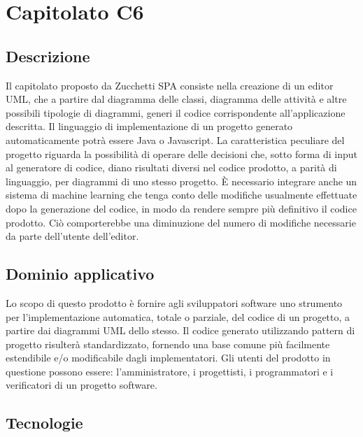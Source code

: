 \newpage
\section{Capitolato C6}

\subsection{Descrizione}

Il capitolato proposto da Zucchetti SPA consiste nella creazione di un editor UML, che a partire dal diagramma delle classi, diagramma delle attività e altre possibili tipologie di diagrammi, generi il codice corrispondente all'applicazione descritta. Il linguaggio di implementazione di un progetto generato automaticamente potrà essere Java o Javascript. La caratteristica peculiare del progetto riguarda la possibilità di operare delle decisioni che, sotto forma di input al generatore di codice, diano risultati diversi nel codice prodotto, a parità di linguaggio, per diagrammi di uno stesso progetto. {\MakeUppercase{è}} necessario integrare anche un sistema di machine learning che tenga conto delle modifiche usualmente effettuate dopo la generazione del codice, in modo da rendere sempre più definitivo il codice prodotto. Ciò comporterebbe una diminuzione del numero di modifiche necessarie da parte dell'utente dell'editor.

\subsection{Dominio applicativo}

Lo scopo di questo prodotto è fornire agli sviluppatori software uno strumento per l'implementazione automatica, totale o parziale, del codice di un progetto, a partire dai diagrammi UML dello stesso. Il codice generato utilizzando pattern di progetto risulterà standardizzato,
fornendo una base comune più facilmente estendibile e/o modificabile dagli implementatori. Gli utenti del prodotto in questione possono essere: l'amministratore, i progettisti, i programmatori e i verificatori di un progetto software.

\subsection{Tecnologie}

